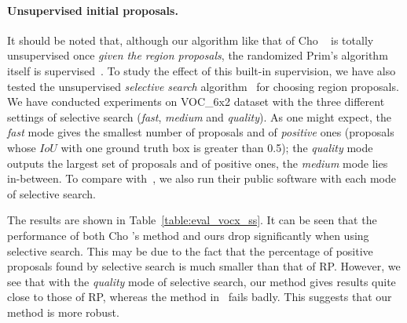 \documentclass[10pt,twocolumn,letterpaper]{article}
\numberwithin{theorem}{section}
\begin{document}
\paragraph{Unsupervised initial proposals.} It should be noted that, although our algorithm like that of Cho \etal~\cite{CKSP15}  is totally unsupervised once {\em given the region
  proposals}, the randomized Prim's algorithm itself is
supervised~\cite{manen2013prime}. To study the effect of this built-in supervision, we have also
tested the unsupervised {\em selective search}
algorithm~\cite{UijlingsIJCV2013} for choosing region proposals. We
have conducted experiments on VOC\_6x2 dataset with the three
different settings of selective search ({\em fast}, {\em medium} and
{\em quality}). As one might expect, the {\em fast} mode gives
the smallest number of proposals and of \textit{positive} ones (proposals
whose $IoU$ with one ground truth box is greater than 0.5); the {\em
  quality} mode outputs the largest set of proposals and of positive ones, 
  the {\em medium} mode lies in-between. To compare with~\cite{CKSP15}, we also run their public software with each mode of
selective search.

\begin{table}[H]
\centering
{}
\vspace{-2mm}
\caption{\small Object discovery on VOC\_6x2 with selective search and
  randomized Prim's as region proposal algorithms.}
\label{table:eval_vocx_ss}
\vspace{-3mm}
\end{table}

The results are shown in
Table~\ref{table:eval_vocx_ss}. It can be seen that the performance of both Cho \etal's method and ours drop significantly when using selective search. This may be due to the fact that the percentage of positive proposals found by selective search is much smaller than that of RP. However, we see that with the {\em quality} mode of selective
search, our method gives results quite close to those of 
RP, whereas the method in~\cite{CKSP15} fails badly.
This suggests that our method is more robust.
\end{document}
